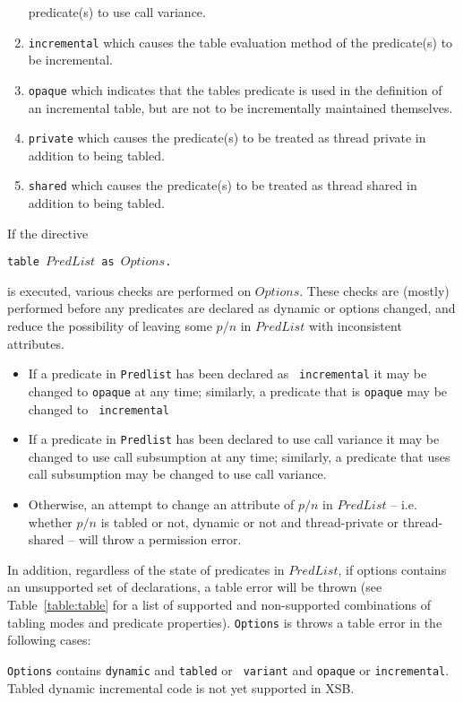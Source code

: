 \begin{description}
\begin{enumerate}
  predicate(s) to use call variance.
%
\item {\tt incremental} which causes the table evaluation method of
  the predicate(s) to be incremental.
%
\item {\tt opaque} which indicates that the tables predicate is used
  in the definition of an incremental table, but are not to be
  incrementally maintained themselves.  
%
\item {\tt private} which causes the predicate(s) to be treated as
  thread private in addition to being tabled.
%
\item {\tt shared} which causes the predicate(s) to be treated as
  thread shared in addition to being tabled.
\ei
\ei
\end{enumerate}

If the directive 

{\tt  table $PredList$ as $Options$.}

is executed, various checks are performed on $Options$.  These checks
are (mostly) performed before any predicates are declared as dynamic
or options changed, and reduce the possibility of leaving some $p/n$
in $PredList$ with inconsistent attributes.
%
\begin{itemize}
\item If a predicate in {\tt Predlist} has been declared as {\tt
  incremental} it may be changed to {\tt opaque} at any time;
  similarly, a predicate that is {\tt opaque} may be changed to {\tt
    incremental}
%
\item If a predicate in {\tt Predlist} has been declared to use call
  variance it may be changed to use call subsumption at any time;
  similarly, a predicate that uses call subsumption may be changed to
  use call variance.
%
\item Otherwise, an attempt to change an attribute of $p/n$ in
  $PredList$ -- i.e. whether $p/n$ is tabled or not, dynamic or not
  and thread-private or thread-shared -- will throw a permission
  error.  
\end{itemize}

In addition, regardless of the state of predicates in $PredList$, if
options contains an unsupported set of declarations, a table error
will be thrown (see Table~\ref{table:table} for a list of supported
and non-supported combinations of tabling modes and predicate
properties).  {\tt Options} is throws a table error in the following
cases:
%
\bi
\item {\tt Options} contains {\tt dynamic} and {\tt tabled} or {\tt
  variant} and {\tt opaque} or {\tt incremental}.  Tabled dynamic
  incremental code is not yet supported in XSB.


\end{description}
